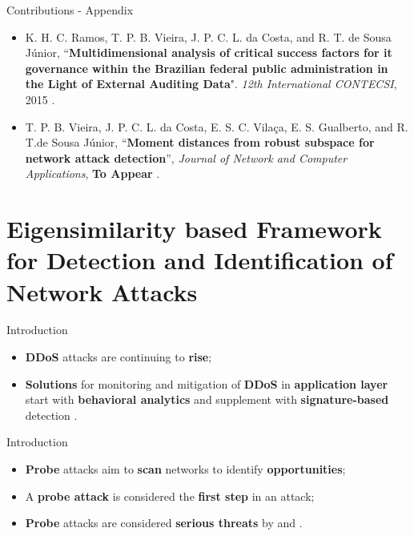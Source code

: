 \documentclass[newPxFont, numfooter, sectionpages]{beamer}
\begin{document}
\begin{frame}[c]{Contributions - Appendix}
    \begin{itemize}
    	\item K. H. C. Ramos, T. P. B. Vieira, J. P. C. L. da Costa, and R. T. de Sousa Júnior, “\textbf{Multidimensional analysis of critical success factors for it governance within the Brazilian federal public administration in the Light of External Auditing Data}". \textit{12th International CONTECSI}, 2015
    	\cite{ramos2015}.
    	\item T. P. B. Vieira, J. P. C. L. da Costa, E. S. C. Vilaça, E. S. Gualberto, and R. T.de Sousa Júnior, “\textbf{Moment distances from robust subspace for network attack detection}”, \textit{Journal of Network and Computer Applications}, \textbf{To Appear} \cite{vieira2019moment}.
    \end{itemize}
\end{frame}

\section{Eigensimilarity based Framework for Detection and Identification of Network Attacks}

\begin{frame}[c]{Introduction}
	\begin{itemize}
		\item \textbf{DDoS} attacks are continuing to \textbf{rise};
		\item \textbf{Solutions} for monitoring and mitigation of \textbf{DDoS} in \textbf{application layer} start with \textbf{behavioral analytics} and supplement with \textbf{signature-based} detection \cite{Hevesi2019}.
	\end{itemize}
\end{frame}

\begin{frame}[c]{Introduction}
	\begin{itemize}
        \item \textbf{Probe} attacks aim to \textbf{scan} networks to identify \textbf{opportunities};
        \item A \textbf{probe attack} is considered the \textbf{first step} in an attack;
        \item \textbf{Probe} attacks are considered \textbf{serious threats} by \cite{ahmed2016survey} and \cite{moustafa2019holistic}.
	\end{itemize}
\end{frame}
\end{document}
